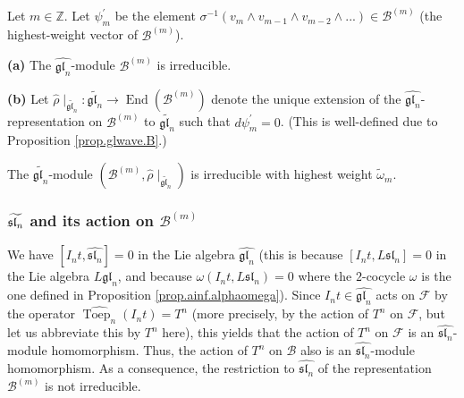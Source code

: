 \documentclass[etingof-lie.tex]{subfiles}
\begin{document}
\begin{proposition}
Let $m\in\mathbb{Z}$. Let $\psi_{m}^{\prime}$ be the element $\sigma
^{-1}\left(  v_{m}\wedge v_{m-1}\wedge v_{m-2}\wedge...\right)  \in
\mathcal{B}^{\left(  m\right)  }$ (the highest-weight vector of $\mathcal{B}%
^{\left(  m\right)  }$).

\textbf{(a)} The $\widehat{\mathfrak{gl}_{n}}$-module $\mathcal{B}^{\left(
m\right)  }$ is irreducible.

\textbf{(b)} Let $\widehat{\rho}\mid_{\widetilde{\mathfrak{gl}_{n}}%
}:\widetilde{\mathfrak{gl}_{n}}\rightarrow\operatorname*{End}\left(
\mathcal{B}^{\left(  m\right)  }\right)  $ denote the unique extension of the
$\widehat{\mathfrak{gl}_{n}}$-representation on $\mathcal{B}^{\left(
m\right)  }$ to $\widetilde{\mathfrak{gl}_{n}}$ such that $d\psi_{m}^{\prime
}=0$. (This is well-defined due to Proposition \ref{prop.glwave.B}.)

The $\widetilde{\mathfrak{gl}_{n}}$-module $\left(  \mathcal{B}^{\left(
m\right)  },\widehat{\rho}\mid_{\widetilde{\mathfrak{gl}_{n}}}\right)  $ is
irreducible with highest weight $\widetilde{\omega}_{m}$.
\end{proposition}

\subsubsection{\texorpdfstring{$\protect\widetilde{\mathfrak{sl}_{n}}$}
{sl-n-tilde} and its action on
\texorpdfstring{$\mathcal{B}^{\left(  m\right)  }$}{the bosonic
Fock space}}

We have $\left[  I_{n}t,\widehat{\mathfrak{sl}_{n}}\right]  =0$ in the Lie
algebra $\widehat{\mathfrak{gl}_{n}}$ (this is because $\left[  I_{n}%
t,L\mathfrak{sl}_{n}\right]  =0$ in the Lie algebra $L\mathfrak{gl}_{n}$, and
because $\omega\left(  I_{n}t,L\mathfrak{sl}_{n}\right)  =0$ where the
$2$-cocycle $\omega$ is the one defined in Proposition
\ref{prop.ainf.alphaomega}). Since $I_{n}t\in\widehat{\mathfrak{gl}_{n}}$ acts
on $\mathcal{F}$ by the operator $\widehat{\operatorname*{Toep}\nolimits_{n}%
}\left(  I_{n}t\right)  =T^{n}$ (more precisely, by the action of $T^{n}$ on
$\mathcal{F}$, but let us abbreviate this by $T^{n}$ here), this yields that
the action of $T^{n}$ on $\mathcal{F}$ is an $\widehat{\mathfrak{sl}_{n}}%
$-module homomorphism. Thus, the action of $T^{n}$ on $\mathcal{B}$ also is an
$\widehat{\mathfrak{sl}_{n}}$-module homomorphism. As a consequence, the
restriction to $\widehat{\mathfrak{sl}_{n}}$ of the representation
$\mathcal{B}^{\left(  m\right)  }$ is not irreducible.
\end{document}
